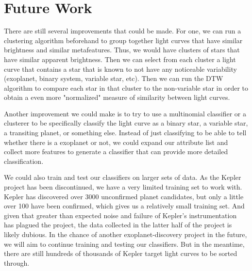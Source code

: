\documentclass{amsart}
\begin{document}
\section{Future Work}
There are still several improvements that could be made. For one, we can run a clustering algorithm beforehand to group together light curves that have similar brightness and similar metafeatures. Thus, we would have clusters of stars that have similar apparent brightness. Then we can select from each cluster a light curve that contains a star that is known to not have any noticeable variability (exoplanet, binary system, variable star, etc). Then we can run the DTW algorithm to compare each star in that cluster to the non-variable star in order to obtain a even more "normalized" measure of similarity between light curves. 

Another improvement we could make is to try to use a multinomial classifier or a clusterer to be specifically classify the light curve as a binary star, a variable star, a transiting planet, or something else. Instead of just classifying to be able to tell whether there is a exoplanet or not, we could expand our attribute list and collect more features to generate a classifier that can provide more detailed classification. 

We could also train and test our classifiers on larger sets of data. As the Kepler project has been discontinued, we have a very limited training set to work with. Kepler has discovered over 3000 unconfirmed planet candidates, but only a little over 100 have been confirmed, which gives us a relatively small training set. And given that greater than expected noise and failure of Kepler's instrumentation has plagued the project, the data collected in the latter half of the project is likely dubious.  In the chance of another exoplanet-discovery project in the future, we will aim to continue training and testing our classifiers. But in the meantime, there are still hundreds of thousands of Kepler target light curves to be sorted through.
\end{document}
